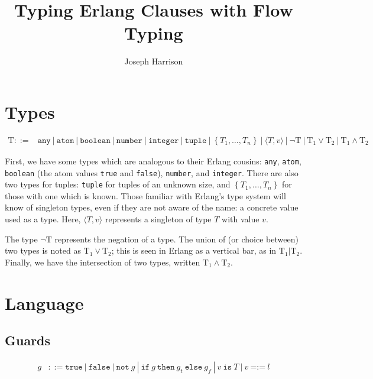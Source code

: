\documentclass[nonacm,timestamp,manuscript]{acmart}
\title{Typing Erlang Clauses with Flow Typing}
\author{Joseph Harrison}
\affiliation{%
  \department{School of Computing}
  \institution{University of Kent}
  \city{Canterbury}
  \country{United Kingdom}}
\newcommand{\alt}{\ |\ }
\newcommand{\atom}[1]{\texttt{#1}}
\newcommand{\tuple}[1][T]{\left\{ {#1}_1, \ldots, {#1}_n \right\}}
\newcommand{\singleton}[2]{\langle #1, #2 \rangle} %
\newcommand{\singletonex}{\singleton{T}{v}}
\newcommand{\type}{\text{T}}
\newcommand{\res}[1]{\texttt{#1}}
\begin{document}
\maketitle

\tableofcontents

\section{Types}

\begin{align*}
  \type ::={}&
               \atom{any} \alt
               \atom{atom} \alt \atom{boolean} \alt
               \atom{number} \alt \atom{integer} \alt
               \atom{tuple} \alt \tuple \alt
               \singletonex \alt
               \neg \type \alt
               {\type}_1 \lor {\type}_2 \alt {\type}_1 \land {\type}_2
\end{align*}

First, we have some types which are analogous to their Erlang cousins:
\atom{any}, \atom{atom}, \atom{boolean} (the atom values \texttt{true} and
\texttt{false}), \atom{number}, and \atom{integer}. There are also two types for
tuples: \atom{tuple} for tuples of an unknown size, and $\tuple$ for those with
one which is known. Those familiar with Erlang's type system will know of
singleton types, even if they are not aware of the name: a concrete value used
as a type. Here, $\singletonex$ represents a singleton of type $T$ with value
$v$.

The type $\neg \type$ represents the negation of a type. The union of (or choice
between) two types is noted as ${\type}_1 \lor {\type}_2$; this is seen in
Erlang as a vertical bar, as in ${\type}_1 | {\type}_2$. Finally, we have the
intersection of two types, written ${\type}_1 \land {\type}_2$.


\section{Language}

\subsection{Guards}

\begin{align*}
  g &{}::= \res{true} \alt \res{false} \alt \res{not}\ g \alt
      \res{if}\ g\ \res{then}\ g_t\ \res{else}\ g_f \alt
      v\ \res{is}\ T \alt v\ \res{=:=}\ l
\end{align*}
\end{document}
